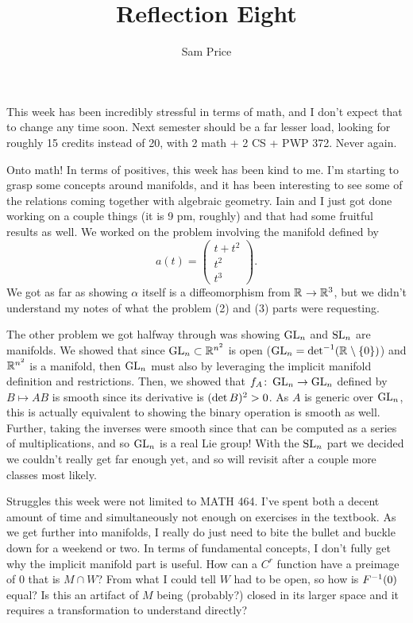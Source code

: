 \documentclass[12pt]{article}
\author{Sam Price}
\title{Reflection Eight}
\begin{document}
\maketitle

This week has been incredibly stressful in terms of math, and I don't expect that to change any time soon.
Next semester should be a far lesser load, looking for roughly 15 credits instead of 20, with 2 math + 2 CS + PWP 372. Never again.

Onto math! In terms of positives, this week has been kind to me.
I'm starting to grasp some concepts around manifolds, and it has been interesting to see some of the relations coming together with algebraic geometry.
Iain and I just got done working on a couple things (it is 9 pm, roughly) and that had some fruitful results as well.
We worked on the problem involving the manifold defined by
\[ a(t) = \begin{pmatrix} t + t^{2} \\ t^{2} \\ t^{3} \end{pmatrix}. \]
We got as far as showing $\alpha$ itself is a diffeomorphism from $\RR \to \RR[3]$, but we didn't understand my notes of what the problem (2) and (3) parts were requesting.

The other problem we got halfway through was showing $\GL_{n}$ and $\SL_{n}$ are manifolds.
We showed that since $\GL_{n} \subset \RR[n^{2}]$ is open ($\GL_{n} = \det\inv(\RR \setminus \set{0})$) and $\RR[n^{2}]$ is a manifold,
then $\GL_{n}$ must also by leveraging the implicit manifold definition and restrictions.
Then, we showed that $f_{A}\from \GL_{n} \to \GL_{n}$ defined by $B \mapsto AB$ is smooth since its derivative is $\pars{\det B}^{2} > 0$.
As $A$ is generic over $\GL_{n}$, this is actually equivalent to showing the binary operation is smooth as well.
Further, taking the inverses were smooth since that can be computed as a series of multiplications, and so $\GL_{n}$ is a real Lie group!
With the $\SL_{n}$ part we decided we couldn't really get far enough yet, and so will revisit after a couple more classes most likely.

Struggles this week were not limited to MATH 464.
I've spent both a decent amount of time and simultaneously not enough on exercises in the textbook.
As we get further into manifolds, I really do just need to bite the bullet and buckle down for a weekend or two.
In terms of fundamental concepts, I don't fully get why the implicit manifold part is useful.
How can a $C^{r}$ function have a preimage of 0 that is $M \cap W$? From what I could tell $W$ had to be open, so how is $F\inv(0)$ equal?
Is this an artifact of $M$ being (probably?) closed in its larger space and it requires a transformation to understand directly?
\end{document}

